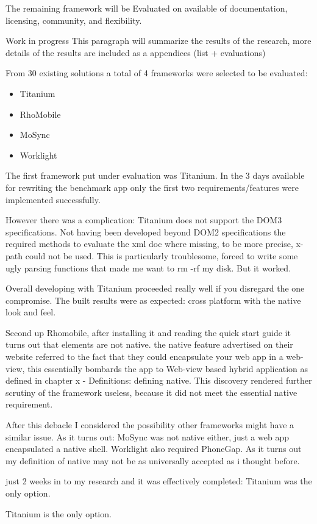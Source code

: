 The remaining framework will be Evaluated on available of documentation, licensing, community, and flexibility.

Work in progress
This paragraph will summarize the results of the research, more details of the results are included as a appendices (list + evaluations) %

From 30 existing solutions a total of 4 frameworks were selected to be evaluated:
\begin{itemize}
	\item Titanium
	\item RhoMobile
	\item MoSync
	\item Worklight
\end{itemize}

The first framework put under evaluation was Titanium. In the 3 days available for rewriting the benchmark app only the first two requirements/features were implemented successfully.

However there was a complication: Titanium does not support the DOM3 specifications. Not having been developed beyond DOM2 specifications the required methods to evaluate the xml doc where missing, to be more precise, x-path could not be used. This is particularly troublesome, forced to write some ugly parsing functions that made me want to rm -rf my disk. But it worked. %

Overall developing with Titanium proceeded really well if you disregard the one compromise. The built results were as expected: cross platform with the native look and feel.

Second up Rhomobile, after installing it and reading the quick start guide it turns out that elements are not native. the native feature advertised on their website referred to the fact that they could encapsulate your web app in a web-view, this essentially bombards the app to Web-view based hybrid application as defined in chapter x - Definitions: defining native. This discovery rendered further scrutiny of the framework useless, because it did not meet the essential native requirement.

After this debacle I considered the possibility other frameworks might have a similar issue. As it turns out: MoSync was not native either, just a web app encapsulated a native shell. Worklight also required PhoneGap. As it turns out my definition of native may not be as universally accepted as i thought before.

just 2 weeks in to my research and it was effectively completed: Titanium was the only option.





Titanium is the only option.
